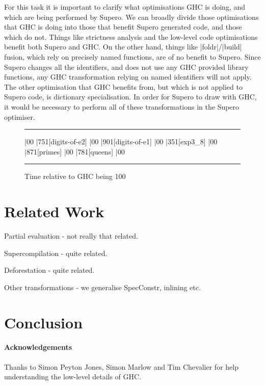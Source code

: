 \documentclass{llncs}
\newenvironment{fig}
    {\begin{figure}[tbp]\hrule}
    {\end{figure}}
\newcommand{\figend}{\hrule}
\begin{document}
For this task it is important to clarify what optimisations GHC is doing, and which are being performed by Supero. We can broadly divide those optimisations that GHC is doing into those that benefit Supero generated code, and those which do not. Things like strictness analysis and the low-level code optimisations benefit both Supero and GHC. On the other hand, things like |foldr|/|build| fusion, which rely on precisely named functions, are of no benefit to Supero. Since Supero changes all the identifiers, and does not use any GHC provided library functions, any GHC transformation relying on named identifiers will not apply. The other optimisation that GHC benefits from, but which is not applied to Supero code, is dictionary specialisation. In order for Supero to draw with GHC, it would be necessary to perform all of these transformations in the Supero optimiser.

\begin{fig}
\begin{barenv}
 
\bar{0}{0}
\bar{75}{1}[digits-of-e2]
\bar{0}{0}
\bar{90}{1}[digits-of-e1]
\bar{0}{0}
\bar{35}{1}[exp3\_8]
\bar{0}{0}
\bar{87}{1}[primes]
\bar{0}{0}
\bar{78}{1}[queens]
\bar{0}{0}
\end{barenv}
\figend
\caption{Time relative to GHC being 100}
\label{fig:haskell_results}
\end{fig}


\section{Related Work}

Partial evaluation - not really that related.

Supercompilation - quite related.

Deforestation - quite related.

Other transformations - we generalise SpecConstr, inlining etc.

\section{Conclusion}

\paragraph{Acknowledgements} Thanks to Simon Peyton Jones, Simon Marlow and Tim Chevalier for help understanding the low-level details of GHC.




\end{document}
